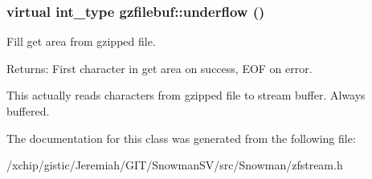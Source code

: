 \subsubsection{\setlength{\rightskip}{0pt plus 5cm}virtual int\_\-type gzfilebuf::underflow ()\hspace{0.3cm}{\tt  [protected, virtual]}}\label{classgzfilebuf_e3223d74f44ca4a29052a14f488821fd}


Fill get area from gzipped file. 

\begin{Desc}
\item[Returns:]First character in get area on success, EOF on error.\end{Desc}
This actually reads characters from gzipped file to stream buffer. Always buffered. 

The documentation for this class was generated from the following file:\begin{CompactItemize}
\item 
/xchip/gistic/Jeremiah/GIT/Snowman\-SV/src/Snowman/zfstream.h\end{CompactItemize}
